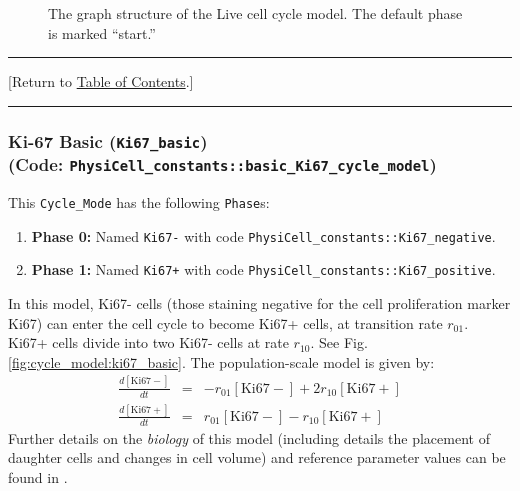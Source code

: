 \documentclass[12pt]{article}
\newcommand{\beqa}{\begin{eqnarray}}
\newcommand{\eeqa}{\end{eqnarray}}
\renewcommand{\v}{\verb}
\renewcommand{\t}[1]{\left[\mathrm{#1}\right]}
\newcommand{\TOClink}{\begin{center}\hrule\vskip-5pt\phantom{.}\hfill[Return to \hyperlink{TOC}{Table of Contents}.]\hfill\phantom{.}\vskip3pt\hrule\end{center}}
\begin{document}
\begin{figure}
\begin{mdframed}[style=mystyle]
\caption{The graph structure of the Live cell cycle model. The default phase is marked 
``start.''}
\label{fig:cycle_model:live}
\end{mdframed}
\end{figure}

\TOClink 

\subsubsection{Ki-67 Basic (\texttt{Ki67\_basic})\\
(Code: \texttt{PhysiCell\_constants::basic\_Ki67\_cycle\_model})}
\label{sec:Standard_Models:Ki67_Basic}
This \v|Cycle_Mode| has the following \v|Phase|s: 
\begin{enumerate}
\item 
\textbf{Phase 0:} Named \v|Ki67-| with code \v|PhysiCell_constants::Ki67_negative|. 

\item 
\textbf{Phase 1:} Named \v|Ki67+| with code \v|PhysiCell_constants::Ki67_positive|. 
\end{enumerate}

In this model, Ki67- cells (those staining negative for the 
cell proliferation marker Ki67) can enter the cell cycle to 
become Ki67+ cells, at transition rate $r_{01}$. Ki67+ cells 
divide into two Ki67- cells at rate $r_{10}$. 
See Fig. \ref{fig:cycle_model:ki67_basic}. The 
population-scale model is given by: 
\beqa
\frac{d\t{Ki67-}}{dt} & = & -r_{01} \t{Ki67-} + 2 r_{10} \t{Ki67+} \\
\frac{d\t{Ki67+}}{dt} & = &  r_{01} \t{Ki67-} -r_{10} \t{Ki67+} 
\eeqa
Further details on the \emph{biology} of this model (including 
details the placement of daughter cells and changes in cell 
volume) and reference parameter values can be found in \cite{ref:PhysiCell}. 
\end{document}
